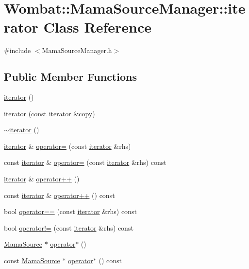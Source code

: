 \hypertarget{classWombat_1_1MamaSourceManager_1_1iterator}{
\section{Wombat::MamaSourceManager::iterator Class Reference}
\label{classWombat_1_1MamaSourceManager_1_1iterator}
}


{\ttfamily \#include $<$MamaSourceManager.h$>$}\subsection*{Public Member Functions}
\begin{DoxyCompactItemize}
\item 
\hyperlink{classWombat_1_1MamaSourceManager_1_1iterator_a6135a7ca51e5ea21a6829124fb7636c8}{iterator} ()
\item 
\hyperlink{classWombat_1_1MamaSourceManager_1_1iterator_a207ad4481186eee1f45a4a8ddc84a98c}{iterator} (const \hyperlink{classWombat_1_1MamaSourceManager_1_1iterator}{iterator} \&copy)
\item 
\hyperlink{classWombat_1_1MamaSourceManager_1_1iterator_a5a003e5144823a7744b07a40ddd27ee7}{$\sim$iterator} ()
\item 
\hyperlink{classWombat_1_1MamaSourceManager_1_1iterator}{iterator} \& \hyperlink{classWombat_1_1MamaSourceManager_1_1iterator_afe9d766f0409bb92af4398589df5aef9}{operator=} (const \hyperlink{classWombat_1_1MamaSourceManager_1_1iterator}{iterator} \&rhs)
\item 
const \hyperlink{classWombat_1_1MamaSourceManager_1_1iterator}{iterator} \& \hyperlink{classWombat_1_1MamaSourceManager_1_1iterator_a6768646f21e818ad2d7cb445c19164e1}{operator=} (const \hyperlink{classWombat_1_1MamaSourceManager_1_1iterator}{iterator} \&rhs) const 
\item 
\hyperlink{classWombat_1_1MamaSourceManager_1_1iterator}{iterator} \& \hyperlink{classWombat_1_1MamaSourceManager_1_1iterator_a590c4be56cc77365f39240cdbf4aa22f}{operator++} ()
\item 
const \hyperlink{classWombat_1_1MamaSourceManager_1_1iterator}{iterator} \& \hyperlink{classWombat_1_1MamaSourceManager_1_1iterator_a3b19e940ac1e731044cfc6c6e2323860}{operator++} () const 
\item 
bool \hyperlink{classWombat_1_1MamaSourceManager_1_1iterator_a017b21e95a34751e98ccbf7d8d138cc3}{operator==} (const \hyperlink{classWombat_1_1MamaSourceManager_1_1iterator}{iterator} \&rhs) const 
\item 
bool \hyperlink{classWombat_1_1MamaSourceManager_1_1iterator_aade82de5391b39bc75685ea50f3f9a8a}{operator!=} (const \hyperlink{classWombat_1_1MamaSourceManager_1_1iterator}{iterator} \&rhs) const 
\item 
\hyperlink{classWombat_1_1MamaSource}{MamaSource} $\ast$ \hyperlink{classWombat_1_1MamaSourceManager_1_1iterator_a267d60af6bbd8af80bd5f797daef5e40}{operator$\ast$} ()
\item 
const \hyperlink{classWombat_1_1MamaSource}{MamaSource} $\ast$ \hyperlink{classWombat_1_1MamaSourceManager_1_1iterator_afb0bef5439aba5c92e0e40197c404fee}{operator$\ast$} () const 
\end{DoxyCompactItemize}

